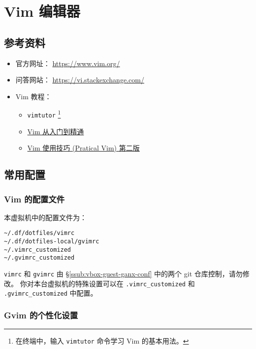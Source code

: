 \documentclass[
    11pt,
    cite=authoryear,
    device=normal,
    lang=cn,
    mode=simple,
    result=answer,
    toc=onecol,
]{elegantbook_sierxue}
\begin{document}
\newpage
\section{Vim 编辑器}%
\label{sec:vim}

\subsection{参考资料}%
\label{sub:vim-refs}

\begin{itemize}
    \item 官方网址： \href{https://www.vim.org/}{https://www.vim.org/}
    \item 问答网站：
        \href{https://vi.stackexchange.com/}{https://vi.stackexchange.com/}
    \item Vim 教程：
        \begin{itemize}
            \item \lstinline{vimtutor}
                \footnote{在终端中，输入 \lstinline{vimtutor} 命令学习 Vim
                的基本用法。}
            \item \href{https://github.com/wsdjeg/vim-galore-zh_cn}
                {Vim 从入门到精通}
            \item \href{https://item.jd.com/12056490.html}
                {Vim 使用技巧 (Pratical Vim) 第二版}
        \end{itemize}
\end{itemize}

\subsection{常用配置}%
\label{sub:vim-intro}

\subsubsection{Vim 的配置文件}%
\label{ssub:vim-config}

本虚拟机中的配置文件为：
\begin{lstlisting}[escapeinside=``]
~/.df/dotfiles/vimrc
~/.df/dotfiles-local/gvimrc
~/.vimrc_customized
~/.gvimrc_customized
\end{lstlisting}
\lstinline{vimrc} 和 \lstinline{gvimrc} 由
\S\ref{ssub:vbox-guest-ganx-conf} 中的两个 git 仓库控制，请勿修改。
你对本台虚拟机的特殊设置可以在 \lstinline{.vimrc_customized} 和
\lstinline{.gvimrc_customized} 中配置。

\subsubsection{Gvim 的个性化设置}%
\label{ssub:vim-gui-config-customized}
\end{document}
